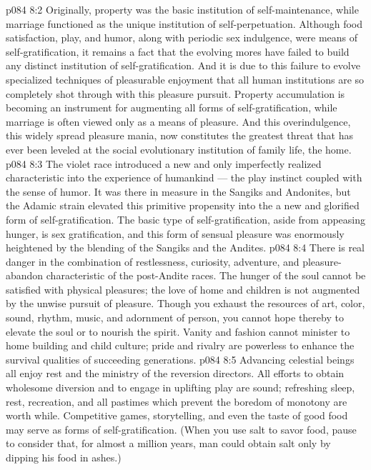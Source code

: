 \vs p084 8:2 Originally, property was the basic institution of self\hyp{}maintenance, while marriage functioned as the unique institution of self\hyp{}perpetuation. Although food satisfaction, play, and humor, along with periodic sex indulgence, were means of self\hyp{}gratification, it remains a fact that the evolving mores have failed to build any distinct institution of self\hyp{}gratification. And it is due to this failure to evolve specialized techniques of pleasurable enjoyment that all human institutions are so completely shot through with this pleasure pursuit. Property accumulation is becoming an instrument for augmenting all forms of self\hyp{}gratification, while marriage is often viewed only as a means of pleasure. And this overindulgence, this widely spread pleasure mania, now constitutes the greatest threat that has ever been leveled at the social evolutionary institution of family life, the home.
\vs p084 8:3 The violet race introduced a new and only imperfectly realized characteristic into the experience of humankind --- the play instinct coupled with the sense of humor. It was there in measure in the Sangiks and Andonites, but the Adamic strain elevated this primitive propensity into the  a new and glorified form of self\hyp{}gratification. The basic type of self\hyp{}gratification, aside from appeasing hunger, is sex gratification, and this form of sensual pleasure was enormously heightened by the blending of the Sangiks and the Andites.
\vs p084 8:4 There is real danger in the combination of restlessness, curiosity, adventure, and pleasure\hyp{}abandon characteristic of the post\hyp{}Andite races. The hunger of the soul cannot be satisfied with physical pleasures; the love of home and children is not augmented by the unwise pursuit of pleasure. Though you exhaust the resources of art, color, sound, rhythm, music, and adornment of person, you cannot hope thereby to elevate the soul or to nourish the spirit. Vanity and fashion cannot minister to home building and child culture; pride and rivalry are powerless to enhance the survival qualities of succeeding generations.
\vs p084 8:5 Advancing celestial beings all enjoy rest and the ministry of the reversion directors. All efforts to obtain wholesome diversion and to engage in uplifting play are sound; refreshing sleep, rest, recreation, and all pastimes which prevent the boredom of monotony are worth while. Competitive games, storytelling, and even the taste of good food may serve as forms of self\hyp{}gratification. (When you use salt to savor food, pause to consider that, for almost a million years, man could obtain salt only by dipping his food in ashes.)
